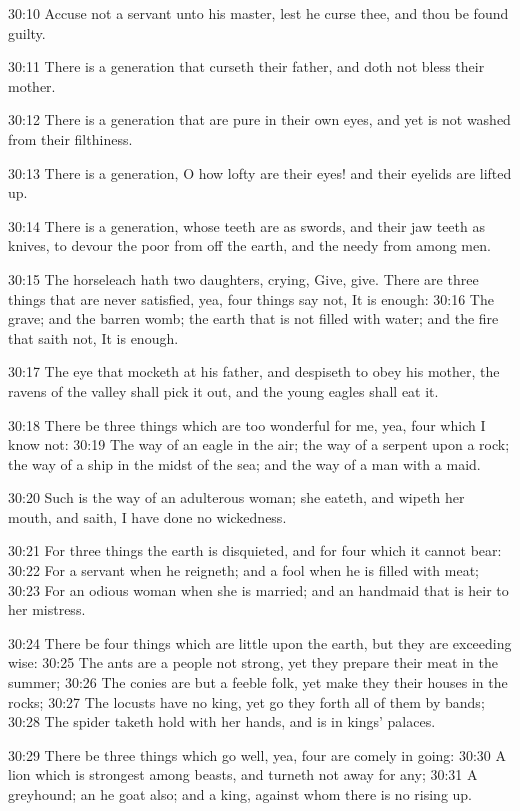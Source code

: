 30:10 Accuse not a servant unto his master, lest he curse thee, and thou be found guilty.

30:11 There is a generation that curseth their father, and doth not bless their mother.

30:12 There is a generation that are pure in their own eyes, and yet is not washed from their filthiness.

30:13 There is a generation, O how lofty are their eyes! and their eyelids are lifted up.

30:14 There is a generation, whose teeth are as swords, and their jaw teeth as knives, to devour the poor from off the earth, and the needy from among men.

30:15 The horseleach hath two daughters, crying, Give, give. There are three things that are never satisfied, yea, four things say not, It is enough: 30:16 The grave; and the barren womb; the earth that is not filled with water; and the fire that saith not, It is enough.

30:17 The eye that mocketh at his father, and despiseth to obey his mother, the ravens of the valley shall pick it out, and the young eagles shall eat it.

30:18 There be three things which are too wonderful for me, yea, four which I know not: 30:19 The way of an eagle in the air; the way of a serpent upon a rock; the way of a ship in the midst of the sea; and the way of a man with a maid.

30:20 Such is the way of an adulterous woman; she eateth, and wipeth her mouth, and saith, I have done no wickedness.

30:21 For three things the earth is disquieted, and for four which it cannot bear: 30:22 For a servant when he reigneth; and a fool when he is filled with meat; 30:23 For an odious woman when she is married; and an handmaid that is heir to her mistress.

30:24 There be four things which are little upon the earth, but they are exceeding wise: 30:25 The ants are a people not strong, yet they prepare their meat in the summer; 30:26 The conies are but a feeble folk, yet make they their houses in the rocks; 30:27 The locusts have no king, yet go they forth all of them by bands; 30:28 The spider taketh hold with her hands, and is in kings' palaces.

30:29 There be three things which go well, yea, four are comely in going: 30:30 A lion which is strongest among beasts, and turneth not away for any; 30:31 A greyhound; an he goat also; and a king, against whom there is no rising up.

